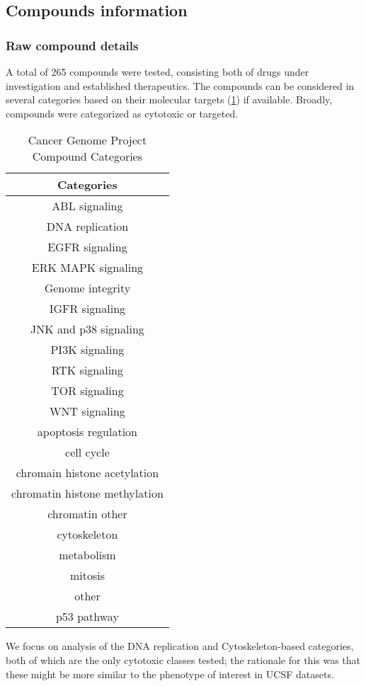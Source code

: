 \subsection{Compounds information}

\subsubsection{Raw compound details}

A total of 265 compounds were tested, consisting both of drugs under
investigation and established therapeutics. The compounds can be
considered in several categories based on their molecular targets (\ref{cmpnds}) if
available. Broadly, compounds were categorized as cytotoxic or
targeted.

\begin{table}
\begin{center}
\begin{tabular}{|c|} \hline
\textbf{Categories} \\ \hline
ABL signaling\\
DNA replication\\
EGFR signaling\\
ERK MAPK signaling\\
Genome integrity\\
IGFR signaling\\
JNK and p38 signaling\\
PI3K signaling\\
RTK signaling\\
TOR signaling\\
WNT signaling\\
apoptosis regulation\\
cell cycle\\
chromain  histone acetylation\\
chromatin  histone methylation\\
chromatin  other\\
cytoskeleton\\
metabolism\\
mitosis\\
other\\
p53 pathway \\ \hline
\end{tabular}
\end{center}
\caption{Cancer Genome Project Compound Categories} \label{cmpnds}
\end{table}

We focus on analysis of the DNA replication and Cytoskeleton-based
categories, both of which are the only cytotoxic classes tested; the
rationale for this was that these might be more similar to the
phenotype of interest in UCSF datasets.

